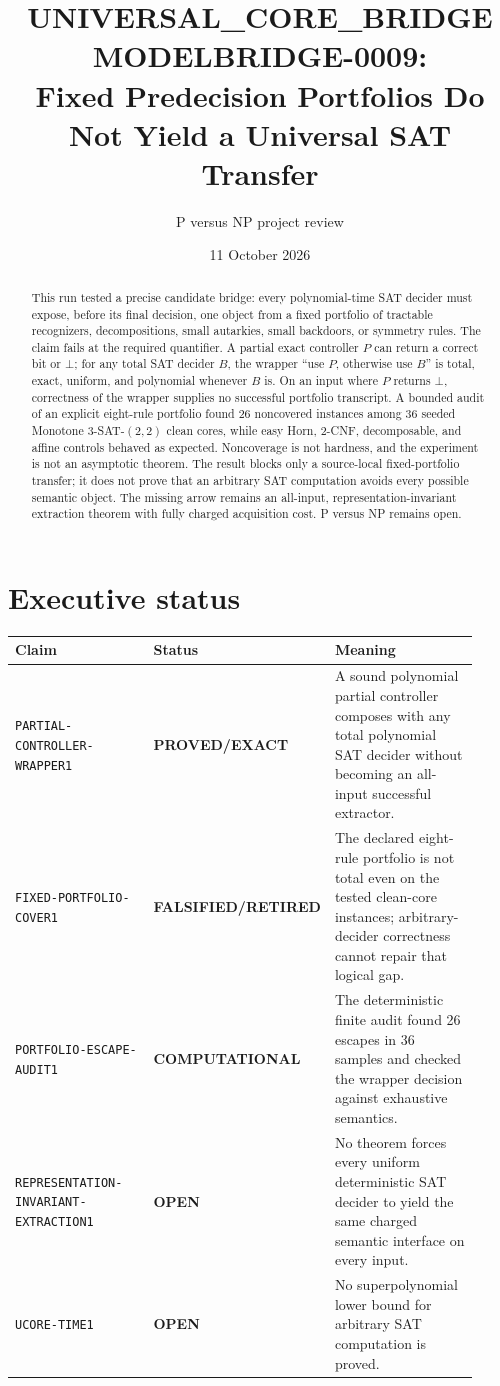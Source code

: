 \documentclass[11pt]{article}
\title{UNIVERSAL\_CORE\_BRIDGE MODELBRIDGE-0009:\\
Fixed Predecision Portfolios Do Not Yield a Universal SAT Transfer}
\author{P versus NP project review}
\date{11 October 2026}
\newcommand{\EXACT}{\textbf{PROVED/EXACT}}
\newcommand{\OPEN}{\textbf{OPEN}}
\newcommand{\RETIRED}{\textbf{FALSIFIED/RETIRED}}
\newcommand{\COMP}{\textbf{COMPUTATIONAL}}
\begin{document}
\maketitle

\begin{abstract}
This run tested a precise candidate bridge: every polynomial-time SAT decider
must expose, before its final decision, one object from a fixed portfolio of
tractable recognizers, decompositions, small autarkies, small backdoors, or
symmetry rules.  The claim fails at the required quantifier.  A partial exact
controller $P$ can return a correct bit or $\bot$; for any total SAT decider
$B$, the wrapper ``use $P$, otherwise use $B$'' is total, exact, uniform, and
polynomial whenever $B$ is.  On an input where $P$ returns $\bot$, correctness
of the wrapper supplies no successful portfolio transcript.  A bounded audit
of an explicit eight-rule portfolio found 26 noncovered instances among 36
seeded Monotone $3$-SAT-$(2,2)$ clean cores, while easy Horn, 2-CNF,
decomposable, and affine controls behaved as expected.  Noncoverage is not
hardness, and the experiment is not an asymptotic theorem.  The result blocks
only a source-local fixed-portfolio transfer; it does not prove that an
arbitrary SAT computation avoids every possible semantic object.  The missing
arrow remains an all-input, representation-invariant extraction theorem with
fully charged acquisition cost.  P versus NP remains open.
\end{abstract}

\section{Executive status}

\begin{center}
\small
\begin{tabular}{p{0.34\linewidth}p{0.20\linewidth}p{0.38\linewidth}}
\toprule
Claim & Status & Meaning\\
\midrule
\texttt{PARTIAL-CONTROLLER-WRAPPER1} & \EXACT &
A sound polynomial partial controller composes with any total polynomial
SAT decider without becoming an all-input successful extractor.\\
\texttt{FIXED-PORTFOLIO-COVER1} & \RETIRED &
The declared eight-rule portfolio is not total even on the tested clean-core
instances; arbitrary-decider correctness cannot repair that logical gap.\\
\texttt{PORTFOLIO-ESCAPE-AUDIT1} & \COMP &
The deterministic finite audit found 26 escapes in 36 samples and checked the
wrapper decision against exhaustive semantics.\\
\texttt{REPRESENTATION-INVARIANT-EXTRACTION1} & \OPEN &
No theorem forces every uniform deterministic SAT decider to yield the same
charged semantic interface on every input.\\
\texttt{UCORE-TIME1} & \OPEN &
No superpolynomial lower bound for arbitrary SAT computation is proved.\\
\bottomrule
\end{tabular}
\end{center}
\end{document}
